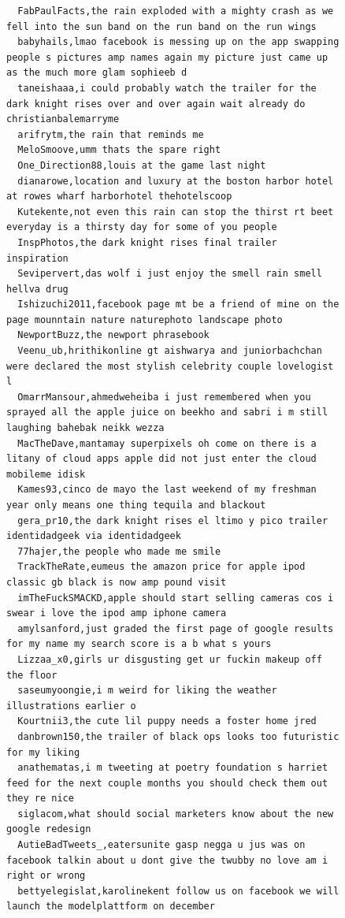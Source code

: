 \begin{figure}[htpb]
\begin{verbatim}
  FabPaulFacts,the rain exploded with a mighty crash as we fell into the sun band on the run band on the run wings
  babyhails,lmao facebook is messing up on the app swapping people s pictures amp names again my picture just came up as the much more glam sophieeb d
  taneishaaa,i could probably watch the trailer for the dark knight rises over and over again wait already do christianbalemarryme
  arifrytm,the rain that reminds me
  MeloSmoove,umm thats the spare right
  One_Direction88,louis at the game last night
  dianarowe,location and luxury at the boston harbor hotel at rowes wharf harborhotel thehotelscoop
  Kutekente,not even this rain can stop the thirst rt beet everyday is a thirsty day for some of you people
  InspPhotos,the dark knight rises final trailer inspiration
  Sevipervert,das wolf i just enjoy the smell rain smell hellva drug
  Ishizuchi2011,facebook page mt be a friend of mine on the page mounntain nature naturephoto landscape photo
  NewportBuzz,the newport phrasebook
  Veenu_ub,hrithikonline gt aishwarya and juniorbachchan were declared the most stylish celebrity couple lovelogist l
  OmarrMansour,ahmedweheiba i just remembered when you sprayed all the apple juice on beekho and sabri i m still laughing bahebak neikk wezza
  MacTheDave,mantamay superpixels oh come on there is a litany of cloud apps apple did not just enter the cloud mobileme idisk
  Kames93,cinco de mayo the last weekend of my freshman year only means one thing tequila and blackout
  gera_pr10,the dark knight rises el ltimo y pico trailer identidadgeek via identidadgeek
  77hajer,the people who made me smile
  TrackTheRate,eumeus the amazon price for apple ipod classic gb black is now amp pound visit
  imTheFuckSMACKD,apple should start selling cameras cos i swear i love the ipod amp iphone camera
  amylsanford,just graded the first page of google results for my name my search score is a b what s yours
  Lizzaa_x0,girls ur disgusting get ur fuckin makeup off the floor
  saseumyoongie,i m weird for liking the weather illustrations earlier o
  Kourtnii3,the cute lil puppy needs a foster home jred
  danbrown150,the trailer of black ops looks too futuristic for my liking
  anathematas,i m tweeting at poetry foundation s harriet feed for the next couple months you should check them out they re nice
  siglacom,what should social marketers know about the new google redesign
  AutieBadTweets_,eatersunite gasp negga u jus was on facebook talkin about u dont give the twubby no love am i right or wrong
  bettyelegislat,karolinekent follow us on facebook we will launch the modelplattform on december

\end{verbatim}
\end{figure}
